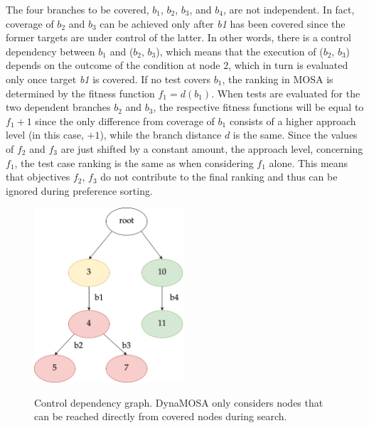 \documentclass[paper=a4,%
  twoside,%
  BCOR4mm,%
  abstract=true,%
  toc=bibliography,%
  chapterprefix=true,%
  toc=bibliographynumbered,%
  open=right,%
  english,%
  pagesize=pdftex]{scrreprt}
\begin{document}
The four branches to be covered, $b_1$, $b_2$, $b_3$, and $b_4$, are not independent. In fact, coverage of $b_2$ and $b_3$ can be achieved only after \emph{b1} has been covered since the former targets are under control of the latter. In other words, there is a control dependency between $b_1$ and ($b_2$, $b_3$), which means that the execution of ($b_2$, $b_3$) depends on the outcome of the condition at node $2$, which in turn is evaluated only once target \emph{b1} is covered. If no test covers $b_1$, the ranking in \ac{MOSA} is determined by the fitness function $f_1 = d(b_1)$. When tests are evaluated for the two dependent branches $b_2$ and $b_3$, the respective fitness functions will be equal to $f_1 + 1$ since the only difference from coverage of $b_1$ consists of a higher approach level (in this case, $+1$), while the branch distance $d$ is the same. Since the values of $f_2$ and $f_3$ are just shifted by a constant amount, the approach level, concerning $f_1$, the test case ranking is the same as when considering $f_1$ alone. This means that objectives $f_2$, $f_3$ do not contribute to the final ranking and thus can be ignored during preference sorting.


\begin{figure}[h]
\caption{Control dependency graph. DynaMOSA only considers nodes that can be reached directly from covered nodes during search.}
\centering
\includegraphics[width=0.5\textwidth]{cdg-code-example}
\label{fig:example-control-dependencies}
\end{figure}
\end{document}
